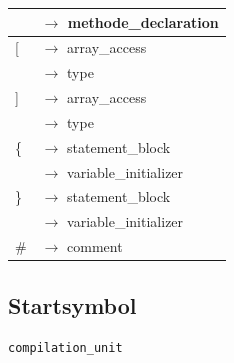 \documentclass[10pt,a4paper,titlepage]{article}
\begin{document}
\begin{ttfamily}
\begin{tabular}{| l  l |}
 & $\to$ methode\_declaration \\\hline
\hspace*{1.5cm}[ & $\to$ array\_access \\
 & $\to$ type \\\hline
\hspace*{1.5cm}] & $\to$ array\_access \\
 & $\to$ type \\\hline
\hspace*{1.5cm}\{ & $\to$ statement\_block \\
 & $\to$ variable\_initializer\\\hline
\hspace*{1.5cm}\} & $\to$ statement\_block \\
 & $\to$ variable\_initializer\\\hline
\hspace*{1.5cm}\# & $\to$ comment\\\hline
\end{tabular}
\end{ttfamily}

\subsection{Startsymbol}
\texttt{compilation\_unit}
\end{document}
